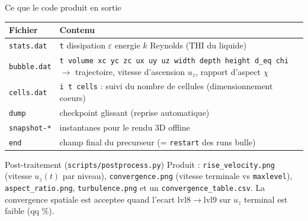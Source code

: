 \documentclass[11pt,aspectratio=169]{beamer}
\begin{document}
\begin{frame}{Ce que le code produit en sortie}
  \footnotesize
  \begin{tabular}{@{}p{2.6cm}p{9.5cm}@{}}
    \toprule
    \textbf{Fichier} & \textbf{Contenu} \\
    \midrule
    \texttt{stats.dat}   & \texttt{t} \quad dissipation $\varepsilon$ \quad energie $k$ \quad Reynolds (THI du liquide) \\
    \texttt{bubble.dat}  & \texttt{t volume xc yc zc ux uy uz width depth height d\_eq chi}
                           $\to$ trajectoire, vitesse d'ascension $u_z$, rapport d'aspect $\chi$ \\
    \texttt{cells.dat}   & \texttt{i t cells} : suivi du nombre de cellules (dimensionnement coeurs) \\
    \texttt{dump}        & checkpoint glissant (reprise automatique) \\
    \texttt{snapshot-*}  & instantanes pour le rendu 3D offline \\
    \texttt{end}         & champ final du precurseur (= \texttt{restart} des runs bulle) \\
    \bottomrule
  \end{tabular}
  \vspace{0.6em}
  \begin{block}{Post-traitement (\texttt{scripts/postprocess.py})}
    \footnotesize
    Produit : \texttt{rise\_velocity.png} (vitesse $u_z(t)$ par niveau),
    \texttt{convergence.png} (vitesse terminale vs \texttt{maxlevel}),
    \texttt{aspect\_ratio.png}, \texttt{turbulence.png} et un
    \texttt{convergence\_table.csv}. La convergence spatiale est acceptee quand
    l'ecart lvl8$\to$lvl9 sur $u_z$ terminal est faible (qq \%).
  \end{block}
\end{frame}
\end{document}
